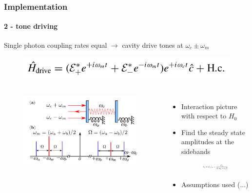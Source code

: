 \documentclass[aspectratio=43]{beamer}
\begin{document}
\begin{frame}

	\frametitle{Implementation}
	\framesubtitle{2 - tone driving}
	
	Single photon coupling rates equal $\longrightarrow$ cavity drive tones at $\omega_{c} \pm \omega_{m}$
	
	\begin{figure}
		\includegraphics[width = 7 cm]{plots/hamiltonian_2_tone.png}
	\end{figure}

	\begin{columns}
		
		
		\begin{figure}
			\includegraphics[width = 7 cm]{plots/plot_2_tone.png}
		\end{figure}	
		
		
		\begin{itemize}
			\item Interaction picture with respect to $H_{0}$
			\item Find the steady state amplitudes at the sidebands
			\begin{figure}
				\includegraphics[width = 5 cm]{plots/ss_2_tone.png}
			\end{figure}
			\item Assumptions used (...)
		\end{itemize}
		
	\end{columns}

\end{frame}
\end{document}
